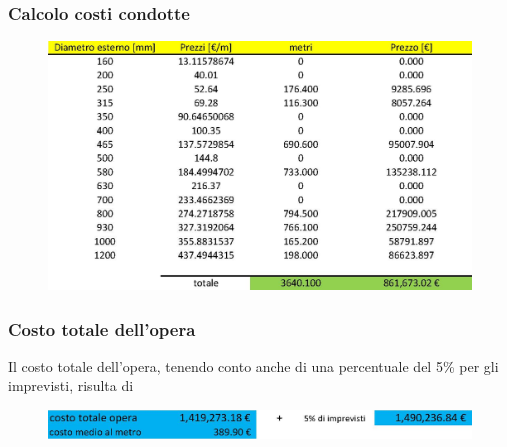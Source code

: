 \documentclass{beamer}
\newcommand{\nologo}{\setbeamertemplate{logo}{}}
\begin{document}
{\nologo
\begin{frame}
 \frametitle{Calcolo costi condotte}
 \begin{figure}
  \centering
  \includegraphics[width = \textwidth]{images/costo_tubi.jpg}
 \end{figure}
\end{frame}
}

\begin{frame}
 \frametitle{Costo totale dell'opera}
 Il costo totale dell'opera, tenendo conto anche di una percentuale del 5\% per gli imprevisti, risulta di
 \begin{figure}
  \centering
  \includegraphics[width=\textwidth]{images/costo_totale}
 \end{figure}
\end{frame}
\end{document}
